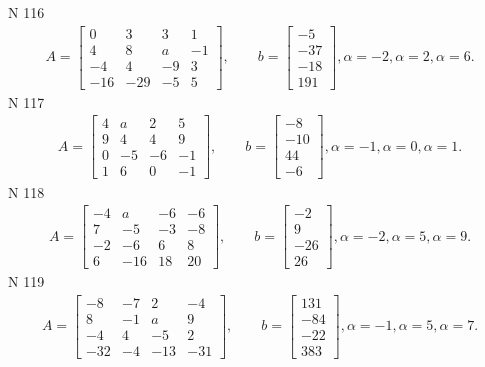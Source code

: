 \documentclass[11pt]{report}
\begin{document}
N 116
\begin{align*}
 A = \left[\begin{matrix}0 & 3 & 3 & 1\\4 & 8 & a & -1\\-4 & 4 & -9 & 3\\-16 & -29 & -5 & 5\end{matrix}\right],
    \qquad b = \left[\begin{matrix}-5\\-37\\-18\\191\end{matrix}\right], \alpha = -2, \alpha = 2, \alpha = 6. 
 \end{align*}
N 117
\begin{align*}
 A = \left[\begin{matrix}4 & a & 2 & 5\\9 & 4 & 4 & 9\\0 & -5 & -6 & -1\\1 & 6 & 0 & -1\end{matrix}\right],
    \qquad b = \left[\begin{matrix}-8\\-10\\44\\-6\end{matrix}\right], \alpha = -1, \alpha = 0, \alpha = 1. 
 \end{align*}
N 118
\begin{align*}
 A = \left[\begin{matrix}-4 & a & -6 & -6\\7 & -5 & -3 & -8\\-2 & -6 & 6 & 8\\6 & -16 & 18 & 20\end{matrix}\right],
    \qquad b = \left[\begin{matrix}-2\\9\\-26\\26\end{matrix}\right], \alpha = -2, \alpha = 5, \alpha = 9. 
 \end{align*}
N 119
\begin{align*}
 A = \left[\begin{matrix}-8 & -7 & 2 & -4\\8 & -1 & a & 9\\-4 & 4 & -5 & 2\\-32 & -4 & -13 & -31\end{matrix}\right],
    \qquad b = \left[\begin{matrix}131\\-84\\-22\\383\end{matrix}\right], \alpha = -1, \alpha = 5, \alpha = 7. 
 \end{align*}
\end{document}
